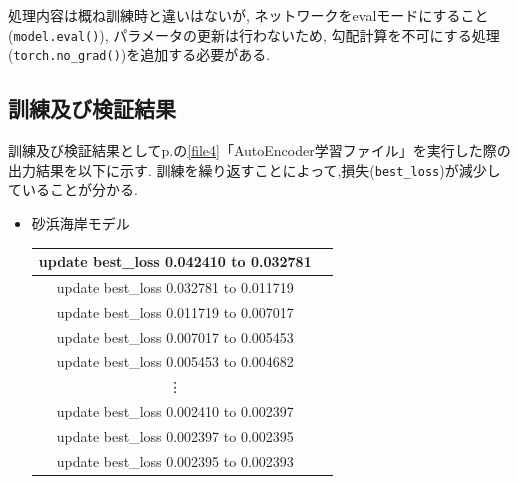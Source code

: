 \documentclass[dvipdfmx]{jsarticle}
\begin{document}
処理内容は概ね訓練時と違いはないが, 
ネットワークをevalモードにすること(\verb|model.eval()|), パラメータの更新は行わないため, 勾配計算を不可にする処理(\verb|torch.no_grad()|)を追加する必要がある.



\subsection{訓練及び検証結果}
訓練及び検証結果としてp.\pageref{file4}の\ref{file4}「AutoEncoder学習ファイル」を実行した際の出力結果を以下に示す.
訓練を繰り返すことによって,損失(\verb|best_loss|)が減少していることが分かる.
\begin{itemize}
    \item 砂浜海岸モデル

    \begin{table}[H]
        \centering
        \begin{tabular}{|c|c|}
        
        
        
        
        
            \hline
            update best\_loss 0.042410 to 0.032781 \\
            \hline
            
            update best\_loss 0.032781 to 0.011719 \\
            \hline
            
            update best\_loss 0.011719 to 0.007017 \\
            \hline
            
            update best\_loss 0.007017 to 0.005453 \\
            \hline
            
            update best\_loss 0.005453 to 0.004682 \\
            \hline

            \vdots \\
            \hline
            
            
            
            
            
            
            update best\_loss 0.002410 to 0.002397 \\
            \hline
            
            update best\_loss 0.002397 to 0.002395 \\
            \hline
            
            update best\_loss 0.002395 to 0.002393 \\
            \hline
            

\end{tabular}
\end{table}
\end{itemize}
\end{document}
